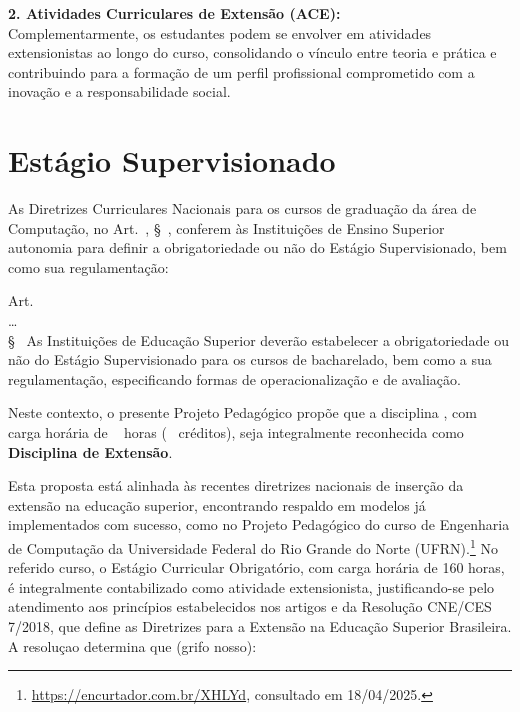 \textbf{2. Atividades Curriculares de Extensão (ACE):}\\
Complementarmente, os estudantes podem se envolver em atividades extensionistas ao longo do curso, consolidando o vínculo entre teoria e prática e contribuindo para a formação de um perfil profissional comprometido com a inovação e a responsabilidade social.

\section{Estágio Supervisionado}
\label{sec:estagio-supervisionado-extensionista}
As Diretrizes Curriculares Nacionais para os cursos de graduação da área de Computação, no Art.~, \S~, conferem às Instituições de Ensino Superior autonomia para definir a obrigatoriedade ou não do Estágio Supervisionado, bem como sua regulamentação:

\begin{itquotation}
    \noindent Art.~\\
    \ldots\\
    \S~   As Instituições de Educação Superior deverão estabelecer a
    obrigatoriedade ou não do Estágio Supervisionado para os cursos de bacharelado, bem como a
    sua regulamentação, especificando formas de operacionalização e de avaliação.
\end{itquotation}

Neste contexto, o presente Projeto Pedagógico propõe que a disciplina \textbf{\EstSup}, com carga horária de \EstSupCH~ horas (\EstSupCred~  créditos), seja integralmente reconhecida como \textbf{Disciplina de Extensão}.

Esta proposta está alinhada às recentes diretrizes nacionais de inserção da extensão na educação superior, encontrando respaldo em modelos já implementados com sucesso, como no Projeto Pedagógico do curso de Engenharia de Computação da Universidade Federal do Rio Grande do Norte (UFRN).\footnote{\url{https://encurtador.com.br/XHLYd}, consultado em 18/04/2025.} No referido curso, o Estágio Curricular Obrigatório, com carga horária de 160 horas, é integralmente contabilizado como atividade extensionista, justificando-se pelo atendimento aos princípios estabelecidos nos artigos  e   da Resolução CNE/CES   7/2018, que define as Diretrizes para a Extensão na Educação Superior Brasileira. A resoluçao determina que (grifo nosso):


